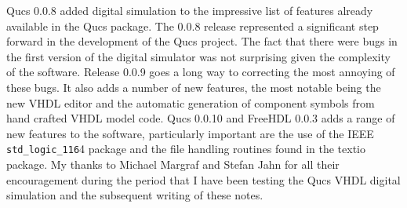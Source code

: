 \FloatBarrier  
{}   

Qucs 0.0.8 added digital simulation to the impressive list of features
already available in the Qucs package.  The 0.0.8 release represented
a significant step forward in the development of the Qucs project.
The fact that there were bugs in the first version of the digital
simulator was not surprising given the complexity of the software.
Release 0.0.9 goes a long way to correcting the most annoying of these
bugs.  It also adds a number of new features, the most notable being
the new VHDL editor and the automatic generation of component symbols
from hand crafted VHDL model code. Qucs 0.0.10 and FreeHDL 0.0.3 adds a range of new features to the software, particularly important are the use of the IEEE \verb|std_logic_116|4 package and the file handling routines found in the textio package. My thanks to Michael Margraf and
Stefan Jahn for all their encouragement during the period that I have
been testing the Qucs VHDL digital simulation and the subsequent
writing of these notes.



